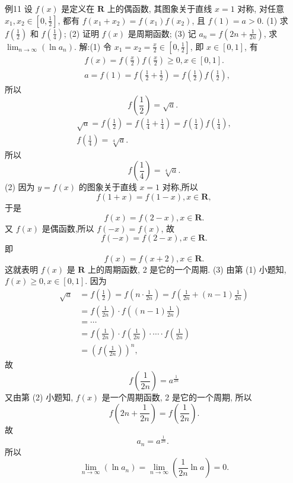 例11 设 $f(x)$ 是定义在 $\mathbf{R}$ 上的偶函数, 其图象关于直线 $x=1$ 对称, 对任意 $x_1, x_2 \in\left[0, \frac{1}{2}\right]$, 都有 $f\left(x_1+x_2\right)=f\left(x_1\right) f\left(x_2\right)$, 且 $f(1)=a>0$.
(1) 求 $f\left(\frac{1}{2}\right)$ 和 $f\left(\frac{1}{4}\right)$;
(2) 证明 $f(x)$ 是周期函数;
(3) 记 $a_n=f\left(2 n+\frac{1}{2 n}\right)$, 求 $\lim _{n \rightarrow \infty}\left(\ln a_n\right)$.
解:(1) 令 $x_1=x_2=\frac{x}{2} \in\left[0, \frac{1}{2}\right]$, 即 $x \in[0,1]$, 有
$$
\begin{aligned}
& f(x)=f\left(\frac{x}{2}\right) f\left(\frac{x}{2}\right) \geqslant 0, x \in[0,1] . \\
& a=f(1)=f\left(\frac{1}{2}+\frac{1}{2}\right)=f\left(\frac{1}{2}\right) f\left(\frac{1}{2}\right),
\end{aligned}
$$
所以
$$
f\left(\frac{1}{2}\right)=\sqrt{a} \text {. }
$$
$$
\begin{gathered}
\sqrt{a}=f\left(\frac{1}{2}\right)=f\left(\frac{1}{4}+\frac{1}{4}\right)=f\left(\frac{1}{4}\right) f\left(\frac{1}{4}\right), \\
f\left(\frac{1}{4}\right)=\sqrt[4]{a} .
\end{gathered}
$$
所以
$$
f\left(\frac{1}{4}\right)=\sqrt[4]{a} .
$$
(2) 因为 $y=f(x)$ 的图象关于直线 $x=1$ 对称,所以
$$
f(1+x)=f(1-x), x \in \mathbf{R},
$$
于是
$$
f(x)=f(2-x), x \in \mathbf{R} .
$$
又 $f(x)$ 是偶函数,所以 $f(-x)=f(x)$, 故
$$
f(-x)=f(2-x), x \in \mathbf{R} .
$$
即
$$
f(x)=f(x+2), x \in \mathbf{R} .
$$
这就表明 $f(x)$ 是 $\mathbf{R}$ 上的周期函数, 2 是它的一个周期.
(3) 由第 (1) 小题知, $f(x) \geqslant 0, x \in[0,1]$. 因为
$$
\begin{aligned}
\sqrt{a} & =f\left(\frac{1}{2}\right)=f\left(n \cdot \frac{1}{2 n}\right)=f\left(\frac{1}{2 n}+(n-1) \frac{1}{2 n}\right) \\
& =f\left(\frac{1}{2 n}\right) \cdot f\left((n-1) \frac{1}{2 n}\right) \\
& =\cdots \\
& =f\left(\frac{1}{2 n}\right) \cdot f\left(\frac{1}{2 n}\right) \cdot \cdots \cdot f\left(\frac{1}{2 n}\right) \\
& =\left(f\left(\frac{1}{2 n}\right)\right)^n,
\end{aligned}
$$
故
$$
f\left(\frac{1}{2 n}\right)=a^{\frac{1}{2 n}}
$$
又由第 (2) 小题知, $f(x)$ 是一个周期函数, 2 是它的一个周期, 所以
$$
f\left(2 n+\frac{1}{2 n}\right)=f\left(\frac{1}{2 n}\right) .
$$
故
$$
a_n=a^{\frac{1}{2 n}} \text {. }
$$
所以
$$
\lim _{n \rightarrow \infty}\left(\ln a_n\right)=\lim _{n \rightarrow \infty}\left(\frac{1}{2 n} \ln a\right)=0 .
$$



